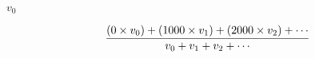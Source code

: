 \documentclass{article}
\begin{document}
$v_0$
\pagebreak

\[ {(0 \times v_0) + (1000 \times v_1) + (2000 \times v_2) + \cdots \over v_0 + v_1 + v_2 + \cdots} \]
\pagebreak
\end{document}
